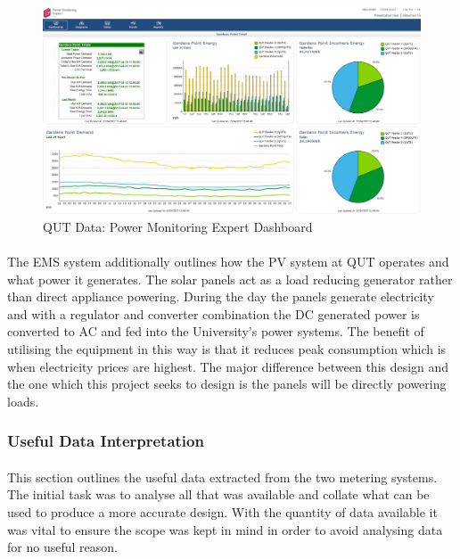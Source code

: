 \begin{figure}[H]
	\hfill\includegraphics[width = 150mm]{images/metering/pme/summary-dashboard}\hspace*{\fill}
	\caption{QUT Data: Power Monitoring Expert Dashboard} 
	\label{fig:qut-summary-dashboard}
\end{figure}

\paragraph{}
The EMS system additionally outlines how the PV system at QUT operates and what power it generates. The solar panels act as a load reducing generator rather than direct appliance powering. During the day the panels generate electricity and with a regulator and converter combination the DC generated power is converted to AC and fed into the University's power systems. The benefit of utilising the equipment in this way is that it reduces peak consumption which is when electricity prices are highest. The major difference between this design and the one which this project seeks to design is the panels will be directly powering loads.

\newpage

\subsubsection{Useful Data Interpretation}

\paragraph{}
This section outlines the useful data extracted from the two metering systems. The initial task was to analyse all that was available and collate what can be used to produce a more accurate design. With the quantity of data available it was vital to ensure the scope was kept in mind in order to avoid analysing data for no useful reason. 

